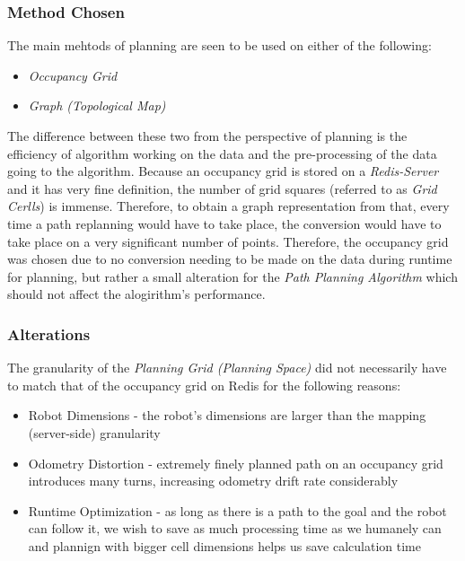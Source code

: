 \documentclass[11pt, a4paper]{article}
\begin{document}
\subsubsection{Method Chosen}

The main mehtods\cite{path_space} of planning are seen to be used on either of the following:

\begin{itemize}
	\item \textit{Occupancy Grid}
	\item \textit{Graph (Topological Map)}
\end{itemize}


The difference between these two from the perspective of planning is the efficiency of algorithm working on the data and the pre-processing of the data going to the algorithm. Because an occupancy grid is stored on a \textit{Redis-Server} and it has very fine definition, the number of grid squares (referred to as \textit{Grid Cerlls}) is immense. Therefore, to obtain a graph representation from that, every time a path replanning would have to take place, the conversion would have to take place on a very significant number of points. Therefore, the occupancy grid was chosen due to no conversion needing to be made on the data during runtime for planning, but rather a small alteration for the \textit{Path Planning Algorithm} which should not affect the alogirithm's performance.

\subsubsection{Alterations}

The granularity of the \textit{Planning Grid (Planning Space)} did not necessarily have to match that of the occupancy grid on Redis for the following reasons:


\begin{itemize}

	\item Robot Dimensions     - the robot's dimensions are larger than the mapping (server-side) granularity
	\item Odometry Distortion  - extremely finely planned path on an occupancy grid introduces many turns, increasing odometry drift rate considerably \cite{task2_report}
	\item Runtime Optimization - as long as there is a path to the goal and the robot can follow it, we wish to save as much processing time as we humanely can and plannign with bigger cell dimensions helps us save calculation time

\end{itemize}
\end{document}
